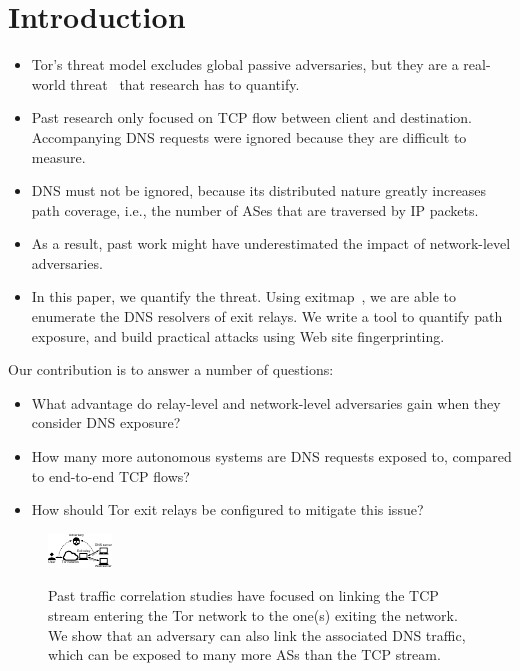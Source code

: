 \section{Introduction}
\label{sec:introduction}

\begin{itemize}
	\item Tor's threat model excludes global passive adversaries, but they are a
		real-world threat~\cite{torstinks} that research has to quantify.

	\item Past research only focused on TCP flow between client and destination.
		Accompanying DNS requests were ignored because they are difficult to
		measure.

	\item DNS must not be ignored, because its distributed nature greatly
		increases path coverage, i.e., the number of ASes that are traversed by
		IP packets.

	\item As a result, past work might have underestimated the impact of
		network-level adversaries.

	\item In this paper, we quantify the threat.  Using
		exitmap~\cite{Winter2014b}, we are able to enumerate the DNS resolvers
		of exit relays.  We write a tool to quantify path exposure, and build
		practical attacks using Web site fingerprinting.
\end{itemize}

Our contribution is to answer a number of questions:
\begin{itemize}
	\item What advantage do relay-level and network-level adversaries gain when
		they consider DNS exposure?

	\item How many more autonomous systems are DNS requests exposed to, compared
		to end-to-end TCP flows?

	\item How should Tor exit relays be configured to mitigate this issue?
\end{itemize}

\begin{figure}[t]
	\centering
	\includegraphics[width=0.8\linewidth]{figures/attack-concept.pdf}
	\label{fig:overview}
	\caption{Past traffic correlation studies have focused on linking the TCP
		stream entering the Tor network to the one(s) exiting the network.  We
		show that an adversary can also link the associated DNS traffic, which
		can be exposed to many more ASs than the TCP stream.}
\end{figure}
